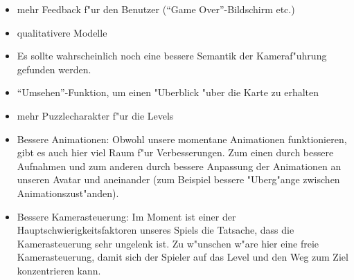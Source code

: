 \begin{itemize}
	\item
		mehr Feedback f"ur den Benutzer (``Game Over''-Bildschirm etc.)
	\item
		qualitativere Modelle
	\item
		Es sollte wahrscheinlich noch eine bessere Semantik
		der Kameraf"uhrung gefunden werden.
	\item
		``Umsehen''-Funktion, um einen "Uberblick "uber die Karte
		zu erhalten
	\item
		mehr Puzzlecharakter f"ur die Levels
	\item Bessere Animationen: Obwohl unsere momentane Animationen funktionieren, gibt es auch hier viel
		Raum f"ur Verbesserungen. Zum einen durch bessere Aufnahmen und zum anderen durch bessere Anpassung
		der Animationen an unseren Avatar und aneinander (zum Beispiel bessere "Uberg"ange zwischen
		Animationszust"anden).
	\item Bessere Kamerasteuerung: Im Moment ist einer der Hauptschwierigkeitsfaktoren unseres Spiels die
		Tatsache, dass die Kamerasteuerung sehr ungelenk ist. Zu w"unschen w"are hier eine freie Kamerasteuerung,
		damit sich der Spieler auf das Level und den Weg zum Ziel konzentrieren kann.
\end{itemize}

